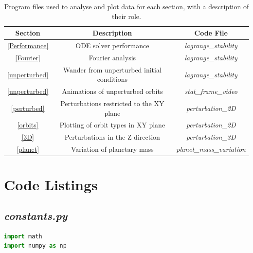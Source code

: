 \documentclass[11pt, a4paper,twocolumn]{article} %
\begin{document}
\begin{appendices}



\onecolumn
\clearpage

\begin{table}[ht!]
	\caption{Program files used to analyse and plot data for each section, with a description of their role.}
	\centering
	\begin{tabular}{|c|c|c|}
		\hline
		\textbf{Section} & \textbf{Description} & \textbf{Code File} \\
		\hline \hline
		\ref{Performance} & ODE solver performance & \textit{lagrange\_stability} \\
		\hline
		\ref{Fourier} & Fourier analysis & \textit{lagrange\_stability} \\
		\hline
		\ref{unperturbed} & Wander from unperturbed initial conditions & \textit{lagrange\_stability} \\
		\hline
		\ref{unperturbed} & Animations of unperturbed orbits & \textit{stat\_frame\_video} \\
		\hline
		\ref{perturbed}& Perturbations restricted to the XY plane & \textit{perturbation\_2D} \\
		\hline
		\ref{orbits}& Plotting of orbit types in XY plane & \textit{perturbation\_2D} \\
		\hline
		\ref{3D}& Perturbations in the Z direction & \textit{perturbation\_3D} \\
		\hline
		\ref{planet}& Variation of planetary mass & \textit{planet\_mass\_variation} \\
		\hline
	\end{tabular}
	\label{Codefiles}
\end{table}

\section{Code Listings} \label{Code}
\subsection{\textit{constants.py}}
\begin{lstlisting}[language=Python]
import math
import numpy as np


\end{lstlisting}
\end{appendices}
\end{document}
